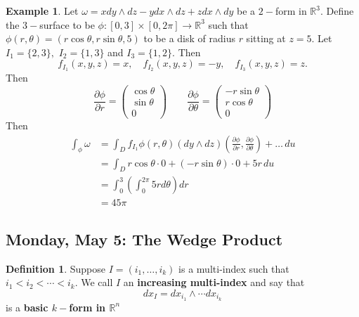 \documentclass[10pt, oneside]{article}
\newcommand{\bbR}{\mathbb{R}}
\theoremstyle{definition}
\newtheorem{exmp}{Example}[section]
\newtheorem{defn}{Definition}
\begin{document}
\begin{exmp}
    Let $\omega = x dy \wedge dz - y dx \wedge dz + zdx \wedge dy$ be a $2-$form in $\bbR^3.$ Define the $3-$surface to be $\phi:[0,3] \times [0,2\pi] \to \bbR^3$ such that $\phi(r,\theta) = (r\cos \theta, r\sin \theta, 5)$ to be a disk of radius $r$ sitting at $z = 5.$ Let $I_1 = \{2,3\},$ $I_2 = \{1,3\}$ and $I_3 = \{1,2\}.$ Then 
    \[f_{I_1}(x,y,z) = x, \quad f_{I_2}(x,y,z) = -y, \quad f_{I_3}(x,y,z) = z.\] Then 
    \[\frac{\partial \phi}{\partial r} = \begin{pmatrix}
        \cos\theta\\
        \sin \theta\\
        0
    \end{pmatrix}\qquad \frac{\partial \phi}{\partial \theta} = \begin{pmatrix}
        -r\sin \theta\\
        r\cos \theta\\
        0
    \end{pmatrix}\] Then 
    \begin{align*}
        \int_\phi \omega &= \int_D f_{I_1}\phi(r,\theta)(dy \wedge dz)(\frac{\partial \phi}{\partial r}, \frac{\partial \phi}{\partial \theta}) + \dots \,du\\
        &= \int_D r\cos\theta\cdot 0 + (-r\sin \theta)\cdot 0+ 5r\, du\\
        &= \int_0^{3}\left(\int_0^{2\pi} 5r d\theta\right) dr\\
        &= 45 \pi
    \end{align*}
\end{exmp}


\newpage
\subsection*{Monday, May 5: The Wedge Product}

\begin{defn}
    Suppose $I = (i_1, \dots, i_k)$ is a multi-index such that $i_1 < i_2< \cdots < i_k.$ We call $I$ an \textbf{increasing multi-index} and say that 
    \[dx_I =dx_{i_1} \wedge \cdots dx_{i_k}\] is a \textbf{basic $k-$form in $\bbR^n$}
\end{defn}
\end{document}
